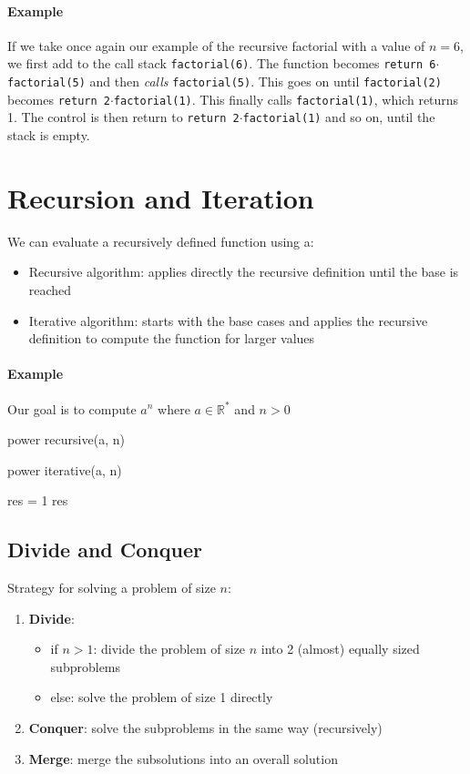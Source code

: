 \documentclass[10pt,a4paper]{book}
\newcommand{\R}{\mathbb{R}}
\begin{document}
\paragraph*{Example}
If we take once again our example of the recursive factorial with a value of $n=6$, we first add to the call stack \texttt{factorial(6)}. The function becomes \texttt{return 6$\cdot$factorial(5)} and then \textit{calls} \texttt{factorial(5)}. This goes on until \texttt{factorial(2)} becomes \texttt{return 2$\cdot$factorial(1)}. This finally calls \texttt{factorial(1)}, which returns 1. The control is then return to \texttt{return 2$\cdot$factorial(1)} and so on, until the stack is empty.
\section{Recursion and Iteration}
We can evaluate a recursively defined function using a:
\begin{itemize}
\item Recursive algorithm: applies directly the recursive definition until the base is reached
\item Iterative algorithm: starts with the base cases and applies the recursive definition to compute the function for larger values
\end{itemize}
\paragraph*{Example}
Our goal is to compute $a^n$ where $a \in \R^{*}$ and $n>0$\par 
\begin{procedure}
\caption{power recursive(a, n)}
\DontPrintSemicolon
\SetAlgoNoEnd
{}
\end{procedure}
\begin{procedure}
\caption{power iterative(a, n)}
\DontPrintSemicolon
\SetAlgoNoEnd
res = 1\;
\KwRet res
\end{procedure}
\subsection{Divide and Conquer}
Strategy for solving a problem of size $n$:
\begin{enumerate}
\item \textbf{Divide}:
\begin{itemize}
\item if $n>1$: divide the problem of size $n$ into 2 (almost) equally sized subproblems
\item else: solve the problem of size 1 directly
\end{itemize}
\item \textbf{Conquer}: solve the subproblems in the same way (recursively)
\item \textbf{Merge}: merge the subsolutions into an overall solution
\end{enumerate}
\end{document}
